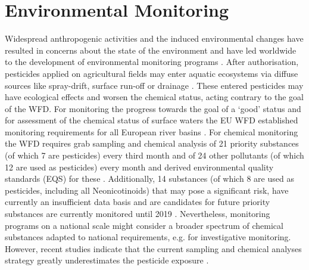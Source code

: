 \section{Environmental Monitoring}

Widespread anthropogenic activities and the induced environmental changes have resulted in concerns about the state of the environment and have led worldwide to the development of environmental monitoring programs \citep{nichols_monitoring_2006}. 
After authorisation, pesticides applied on agricultural fields may enter aquatic ecosystems via diffuse sources like spray-drift, surface run-off or drainage \citep{schulz_field_2004, stehle_probabilistic_2013, liess_determination_1999, carter_how_2000}. 
These entered pesticides may have ecological effects and worsen the chemical status, acting contrary to the goal of the WFD. 
For monitoring the progress towards the goal of a `good' status and for assessment of the chemical status of surface waters the EU WFD established monitoring requirements for all European river basins \citep{european_union_directive_2000}. 
For chemical monitoring the WFD requires grab sampling and chemical analysis of 21 priority substances (of which 7 are pesticides) every third month and of 24 other pollutants (of which 12 are used as pesticides) every month and derived environmental quality standards (EQS) for these \citep{european_union_directive_2013}. 
Additionally, 14 substances (of which 8 are used as pesticides, including all Neonicotinoids) that may pose a significant risk, have currently an insufficient data basis and are candidates for future priority substances are currently monitored until 2019 \citep{european_union_commission_2015}.
Nevertheless, monitoring programs on a national scale might consider a broader spectrum of chemical substances adapted to national requirements, e.g. for investigative monitoring.
However, recent studies indicate that the current sampling and chemical analyses strategy greatly underestimates the pesticide exposure \citep{stehle_probabilistic_2013, xing_influences_2013, moschet_how_2014}. 

